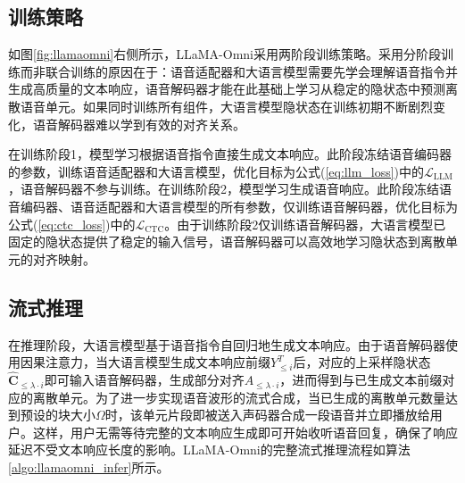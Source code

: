 \subsection{训练策略}

如图\ref{fig:llamaomni}右侧所示，LLaMA-Omni采用两阶段训练策略。采用分阶段训练而非联合训练的原因在于：语音适配器和大语言模型需要先学会理解语音指令并生成高质量的文本响应，语音解码器才能在此基础上学习从稳定的隐状态中预测离散语音单元。如果同时训练所有组件，大语言模型隐状态在训练初期不断剧烈变化，语音解码器难以学到有效的对齐关系。

在训练阶段1，模型学习根据语音指令直接生成文本响应。此阶段冻结语音编码器的参数，训练语音适配器和大语言模型，优化目标为公式(\ref{eq:llm_loss})中的$\mathcal{L}_{\text{LLM}}$，语音解码器不参与训练。在训练阶段2，模型学习生成语音响应。此阶段冻结语音编码器、语音适配器和大语言模型的所有参数，仅训练语音解码器，优化目标为公式(\ref{eq:ctc_loss})中的$\mathcal{L}_{\text{CTC}}$。由于训练阶段2仅训练语音解码器，大语言模型已固定的隐状态提供了稳定的输入信号，语音解码器可以高效地学习隐状态到离散单元的对齐映射。

\subsection{流式推理}

在推理阶段，大语言模型基于语音指令自回归地生成文本响应。由于语音解码器使用因果注意力，当大语言模型生成文本响应前缀$Y^T_{\leq i}$后，对应的上采样隐状态$\widehat{\mathbf{C}}_{\leq \lambda \cdot i}$即可输入语音解码器，生成部分对齐$A_{\leq \lambda \cdot i}$，进而得到与已生成文本前缀对应的离散单元。为了进一步实现语音波形的流式合成，当已生成的离散单元数量达到预设的块大小$\Omega$时，该单元片段即被送入声码器合成一段语音并立即播放给用户。这样，用户无需等待完整的文本响应生成即可开始收听语音回复，确保了响应延迟不受文本响应长度的影响。LLaMA-Omni的完整流式推理流程如算法\ref{algo:llamaomni_infer}所示。

